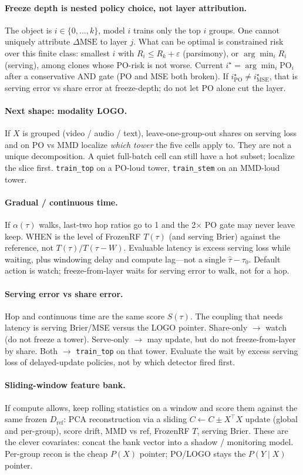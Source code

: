 \documentclass[11pt]{article}
\begin{document}
\paragraph{Freeze depth is nested policy choice, not layer attribution.}
The object is $i\in\{0,\ldots,k\}$, model $i$ trains only the top $i$ groups.
One cannot uniquely attribute $\Delta\mathrm{MSE}$ to layer $j$.
What can be optimal is constrained risk over this finite class:
smallest $i$ with $R_i\le R_k+\varepsilon$ (parsimony), or $\arg\min_i R_i$ (serving), among clones whose PO-risk is not worse.
Current $i^\star=\arg\min_i\mathrm{PO}_i$ after a conservative AND gate (PO and MSE both broken).
If $i^\star_{\mathrm{PO}}\ne i^\star_{\mathrm{MSE}}$, that is serving error vs share error at freeze-depth; do not let PO alone cut the layer.

\paragraph{Next shape: modality LOGO.}
If $X$ is grouped (video / audio / text), leave-one-group-out shares on serving loss and on PO vs MMD localize \emph{which tower} the five cells apply to.
They are not a unique decomposition.
A quiet full-batch cell can still have a hot subset; localize the slice first.
\texttt{train\_top} on a PO-loud tower, \texttt{train\_stem} on an MMD-loud tower.

\paragraph{Gradual / continuous time.}
If \(\alpha(\tau)\) walks, last-two hop ratios go to 1 and the 2$\times$ PO gate may never leave keep.
WHEN is the level of FrozenRF $T(\tau)$ (and serving Brier) against the reference, not $T(\tau)/T(\tau-W)$.
Evaluable latency is excess serving loss while waiting, plus windowing delay and compute lag---not a single $\hat\tau-\tau_0$.
Default action is watch; freeze-from-layer waits for serving error to walk, not for a hop.

\paragraph{Serving error vs share error.}
Hop and continuous time are the same score $S(\tau)$.
The coupling that needs latency is serving Brier/MSE versus the LOGO pointer.
Share-only $\to$ watch (do not freeze a tower). Serve-only $\to$ may update, but do not freeze-from-layer by share.
Both $\to$ \texttt{train\_top} on that tower.
Evaluate the wait by excess serving loss of delayed-update policies, not by which detector fired first.

\paragraph{Sliding-window feature bank.}
If compute allows, keep rolling statistics on a window and score them against the same frozen $D_{\mathrm{ref}}$: PCA reconstruction via a sliding $C\leftarrow C\pm X^\top X$ update (global and per-group), score drift, MMD vs ref, FrozenRF $T$, serving Brier.
These are the clever covariates: concat the bank vector into a shadow / monitoring model. Per-group recon is the cheap $P(X)$ pointer; PO/LOGO stays the $P(Y\mid X)$ pointer.
\end{document}
